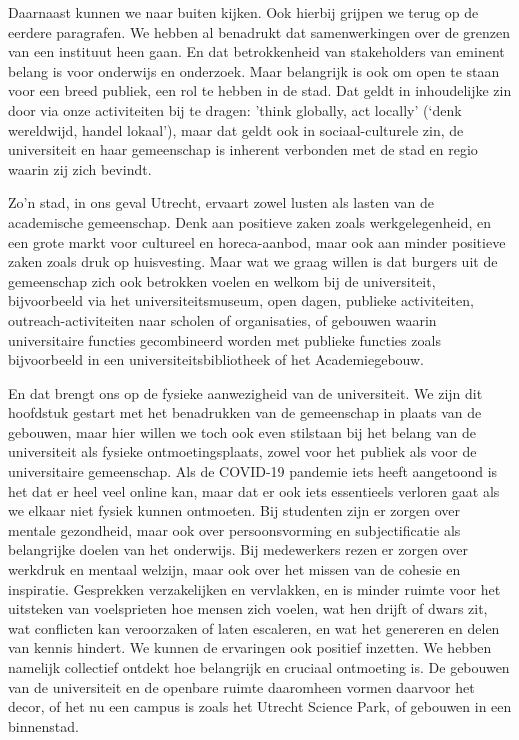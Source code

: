 \documentclass{jote-book}
\begin{document}
	Daarnaast kunnen we naar buiten kijken. Ook hierbij grijpen we terug op de eerdere paragrafen. We hebben al benadrukt dat samenwerkingen over de grenzen van een instituut heen gaan. En dat betrokkenheid van stakeholders van eminent belang is voor onderwijs en onderzoek. Maar belangrijk is ook om open te staan voor een breed publiek, een rol te hebben in de stad. Dat geldt in inhoudelijke zin door via onze activiteiten bij te dragen: 'think globally, act locally' (‘denk wereldwijd, handel lokaal'), maar dat geldt ook in sociaal-culturele zin, de universiteit en haar gemeenschap is inherent verbonden met de stad en regio waarin zij zich bevindt.



	Zo'n stad, in ons geval Utrecht, ervaart zowel lusten als lasten van de academische gemeenschap. Denk aan positieve zaken zoals werkgelegenheid, en een grote markt voor cultureel en horeca-aanbod, maar ook aan minder positieve zaken zoals druk op huisvesting. Maar wat we graag willen is dat burgers uit de gemeenschap zich ook betrokken voelen en welkom bij de universiteit, bijvoorbeeld via het universiteitsmuseum, open dagen, publieke activiteiten, outreach-activiteiten naar scholen of organisaties, of gebouwen waarin universitaire functies gecombineerd worden met publieke functies zoals bijvoorbeeld in een universiteitsbibliotheek of het Academiegebouw.



	En dat brengt ons op de fysieke aanwezigheid van de universiteit. We zijn dit hoofdstuk gestart met het benadrukken van de gemeenschap in plaats van de gebouwen, maar hier willen we toch ook even stilstaan bij het belang van de universiteit als fysieke ontmoetingsplaats, zowel voor het publiek als voor de universitaire gemeenschap. Als de COVID-19 pandemie iets heeft aangetoond is het dat er heel veel online kan, maar dat er ook iets essentieels verloren gaat als we elkaar niet fysiek kunnen ontmoeten. Bij studenten zijn er zorgen over mentale gezondheid, maar ook over persoonsvorming en subjectificatie als belangrijke doelen van het onderwijs. Bij medewerkers rezen er zorgen over werkdruk en mentaal welzijn, maar ook over het missen van de cohesie en inspiratie. Gesprekken verzakelijken en vervlakken, en is minder ruimte voor het uitsteken van voelsprieten hoe mensen zich voelen, wat hen drijft of dwars zit, wat conflicten kan veroorzaken of laten escaleren, en wat het genereren en delen van kennis hindert. We kunnen de ervaringen ook positief inzetten. We hebben namelijk collectief ontdekt hoe belangrijk en cruciaal ontmoeting is. De gebouwen van de universiteit en de openbare ruimte daaromheen vormen daarvoor het decor, of het nu een campus is zoals het Utrecht Science Park, of gebouwen in een binnenstad.
\end{document}
